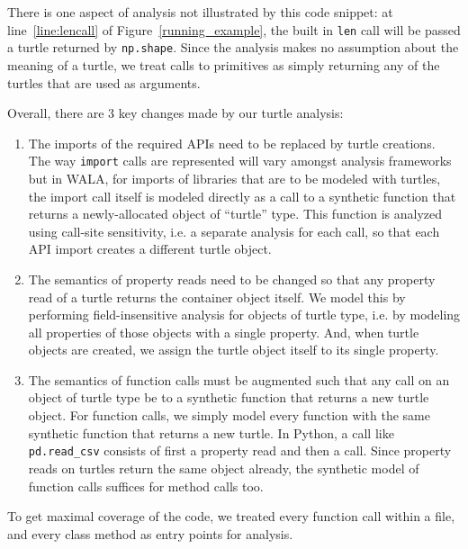 There is one aspect of analysis not illustrated by this code snippet: at line~\ref{line:lencall} of Figure~\ref{running_example}, the built in {\tt len} call will be passed a turtle returned by {\tt np.shape}.  Since the analysis makes no assumption about the meaning of a turtle, we treat calls to primitives as simply returning any of the turtles that are used as arguments.

Overall, there are 3 key changes made by our turtle analysis:
\begin{enumerate}
\item The imports of the required APIs need to be replaced by turtle creations.  The way {\tt import} calls are represented will vary amongst analysis frameworks but in WALA, for imports of libraries that are to be modeled with turtles, the import call itself is modeled directly as a call to a synthetic function that returns a newly-allocated object of ``turtle'' type.  This function is analyzed using call-site sensitivity, i.e. a separate analysis for each call, so that each API import creates a different turtle object.
\item The semantics of property reads need to be changed so that any property read of a turtle returns the container object itself.  We model this by performing field-insensitive analysis for objects of turtle type, i.e. by modeling all properties of those objects with a single property.  And, when turtle objects are created, we assign the turtle object itself to its single property.
\item The semantics of function calls must be augmented such that any call on an object of turtle type be to a synthetic function that returns a new turtle object.  For function calls, we simply model every function with the same synthetic function that returns a new turtle.  In Python, a call like {\tt pd.read\_csv} consists of first a property read and then a call.  Since property reads on turtles return the same object already, the synthetic model of function calls suffices for method calls too.
\end{enumerate}
To get maximal coverage of the code, we treated every function call within a file, and every class method as entry points for analysis.
